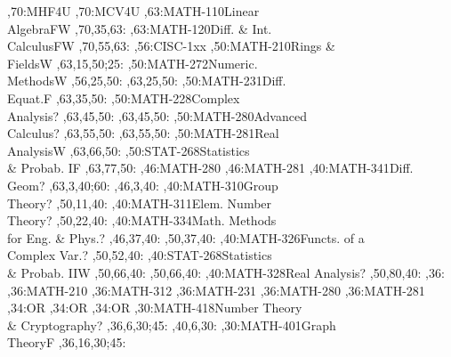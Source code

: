 \documentclass{article}
\begin{document}
\thispagestyle{empty}
\begin{chart}
\grid
{},70:{MHF4U}
,70:{MCV4U}
,63:{MATH-110}{Linear\\Algebra}{FW}
  ,70,35,63:
,63:{MATH-120}{Diff. \& Int.\\Calculus}{FW}
  ,70,55,63:
,56:{CISC-1xx}
,50:{MATH-210}{Rings \&\\Fields}{W}
  ,63,15,50;25:
,50:{MATH-272}{Numeric.\\Methods}{W}
  ,56,25,50:
  ,63,25,50:
,50:{MATH-231}{Diff.\\Equat.}{F}
  ,63,35,50:
,50:{MATH-228}{Complex\\Analysis}{?}
  ,63,45,50:
  ,63,45,50:
,50:{MATH-280}{Advanced\\Calculus}{?}
  ,63,55,50:
  ,63,55,50:
,50:{MATH-281}{Real\\Analysis}{W}
  ,63,66,50:
,50:{STAT-268}{Statistics\\\& Probab. I}{F}
  ,63,77,50:
,46:{MATH-280}
,46:{MATH-281}
,40:{MATH-341}{Diff.\\Geom}{?}
  ,63,3,40;60:
  ,46,3,40:
,40:{MATH-310}{Group\\Theory}{?}
  ,50,11,40:
,40:{MATH-311}{Elem. Number\\Theory}{?}
  ,50,22,40:
,40:{MATH-334}{Math. Methods\\for Eng. \& Phys.}{?}
  ,46,37,40:
  ,50,37,40:
,40:{MATH-326}{Functs. of a\\Complex Var.}{?}
  ,50,52,40:
,40:{STAT-268}{Statistics\\\& Probab. II}{W}
  ,50,66,40:
  ,50,66,40:
,40:{MATH-328}{Real Analysis}{?}
  ,50,80,40:
,36:{}
,36:{MATH-210}
,36:{MATH-312}
,36:{MATH-231}
,36:{MATH-280}
,36:{MATH-281}
,34:{OR}
,34:{OR}
,34:{OR}
,30:{MATH-418}{Number Theory\\\& Cryptography}{?}
  ,36,6,30;45:
  ,40,6,30:
,30:{MATH-401}{Graph\\Theory}{F}
  ,36,16,30;45:

\end{chart}
\end{document}
